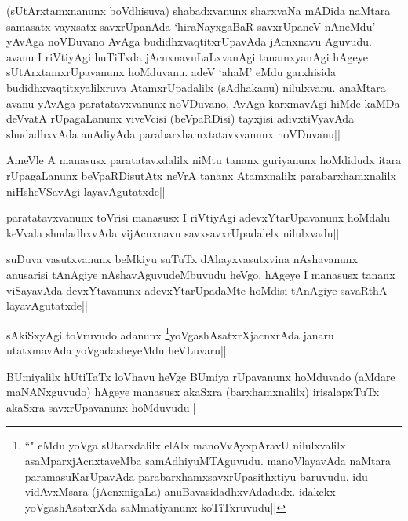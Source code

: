 
\begin{artha} 
(sUtArxtamxnanunx boVdhisuva) shabadxvanunx sharxvaNa mADida naMtara 
samasatx vayxsatx savxrUpanAda `hiraNayxgaBaR savxrUpaneV nAneMdu' 
yAvAga noVDuvano AvAga budidhxvaqtitxrUpavAda jAcnxnavu Aguvudu. avanu 
I riVtiyAgi huTiTxda jAcnxnavuLaLxvanAgi tanamxyanAgi hAgeye 
sUtArxtamxrUpavanunx hoMduvanu. adeV `ahaM' eMdu garxhisida 
budidhxvaqtitxyalilxruva AtamxrUpadalilx (sAdhakanu) nilulxvanu. 
anaMtara avanu yAvAga paratatavxvanunx noVDuvano, AvAga karxmavAgi 
hiMde kaMDa deVvatA rUpagaLanunx viveVcisi (beVpaRDisi) tayxjisi 
adivxtiVyavAda shudadhxvAda anAdiyAda parabarxhamxtatavxvanunx 
noVDuvanu||
\end{artha}

\begin{artha} 
AmeVle A manasusx paratatavxdalilx niMtu tananx guriyanunx hoMdidudx 
itara rUpagaLanunx beVpaRDisutAtx neVrA tananx Atamxnalilx 
parabarxhamxnalilx niHsheVSavAgi layavAgutatxde||
\end{artha}

\begin{artha} 
paratatavxvanunx toVrisi manasusx I riVtiyAgi adevxYtarUpavanunx 
hoMdalu keVvala shudadhxvAda vijAcnxnavu savxsavxrUpadalelx 
nilulxvadu||
\end{artha}

\begin{artha} 
suDuva vasutxvanunx beMkiyu suTuTx dAhayxvasutxvina nAshavanunx 
anusarisi tAnAgiye nAshavAguvudeMbuvudu heVgo, hAgeye I manasusx 
tananx viSayavAda devxYtavanunx adevxYtarUpadaMte hoMdisi tAnAgiye 
savaRthA layavAgutatxde||
\end{artha}

\begin{artha} 
sAkiSxyAgi toVruvudo adanunx \footnote[1]{``\stext" eMdu yoVga 
sUtarxdalilx elAlx manoVvAyxpAravU nilulxvalilx asaMparxjAcnxtaveMba 
samAdhiyuMTAguvudu. manoVlayavAda naMtara paramasuKarUpavAda 
parabarxhamxsavxrUpasithxtiyu baruvudu. idu vidAvxMsara (jAcnxnigaLa) 
anuBavasidadhxvAdadudx. idakekx yoVgashAsatxrXda saMmatiyanunx 
koTiTxruvudu||}yoVgashAsatxrXjacnxrAda 
janaru utatxmavAda yoVgadasheyeMdu heVLuvaru||
\end{artha}

\begin{artha} 
BUmiyalilx hUtiTaTx loVhavu heVge BUmiya rUpavanunx hoMduvado (aMdare 
maNANxguvudo) hAgeye manasusx akaSxra (barxhamxnalilx) irisalapxTuTx 
akaSxra savxrUpavanunx hoMduvudu||
\end{artha}

